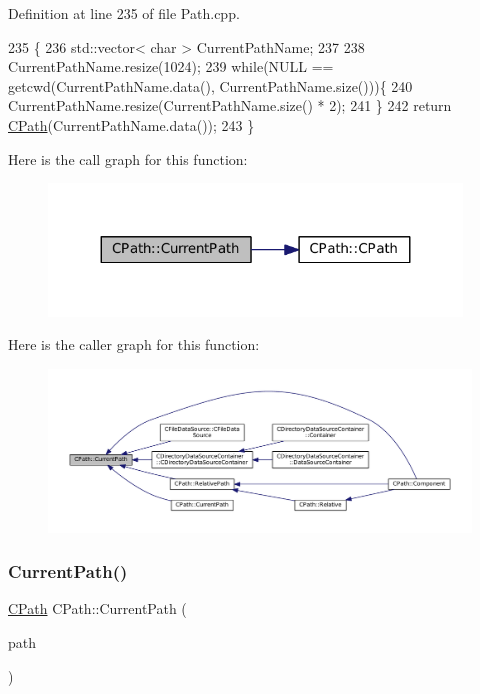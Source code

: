 Definition at line 235 of file Path.\+cpp.


\begin{DoxyCode}
235                         \{
236     std::vector< char > CurrentPathName;
237 
238     CurrentPathName.resize(1024);
239     \textcolor{keywordflow}{while}(NULL == getcwd(CurrentPathName.data(), CurrentPathName.size()))\{
240         CurrentPathName.resize(CurrentPathName.size() * 2);
241     \}
242     \textcolor{keywordflow}{return} \hyperlink{classCPath_a26b6e34c8019d440136848f809c13897}{CPath}(CurrentPathName.data());
243 \}
\end{DoxyCode}
Here is the call graph for this function\+:
\nopagebreak
\begin{figure}[H]
\begin{center}
\leavevmode
\includegraphics[width=311pt]{classCPath_a5161b834e754b217ddead2437eaaa223_cgraph}
\end{center}
\end{figure}
Here is the caller graph for this function\+:
\nopagebreak
\begin{figure}[H]
\begin{center}
\leavevmode
\includegraphics[width=350pt]{classCPath_a5161b834e754b217ddead2437eaaa223_icgraph}
\end{center}
\end{figure}
\hypertarget{classCPath_a87ec01e5af0eb4e2184caf1d9ecc8892}{}\label{classCPath_a87ec01e5af0eb4e2184caf1d9ecc8892} 
\subsubsection{\texorpdfstring{Current\+Path()}{CurrentPath()}\hspace{0.1cm}{\footnotesize\ttfamily [2/2]}}
{\footnotesize\ttfamily \hyperlink{classCPath}{C\+Path} C\+Path\+::\+Current\+Path (\begin{DoxyParamCaption}\item[{const \hyperlink{classCPath}{C\+Path} \&}]{path }\end{DoxyParamCaption})\hspace{0.3cm}{\ttfamily [static]}}



